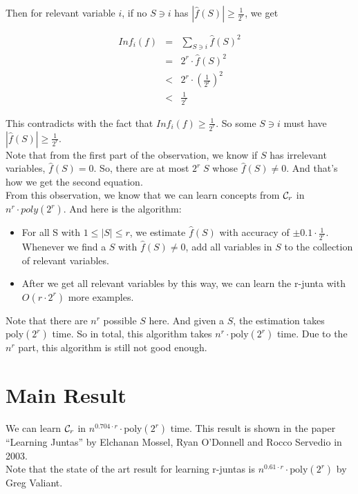 \documentclass[12pt]{article}
\newcommand{\calc}{{\cal C}}
\newcommand{\poly}{\mathrm{poly}}
\begin{document}
Then for relevant variable $i$, if no $S \ni i$ has $|\hat {f}(S)| \ge
\frac {1}{2^r}$, we get

\begin{eqnarray*}
Inf_i(f)
&=& \sum_{S \ni i} \hat {f}(S)^2 \\
&=& 2^r \cdot \hat {f}(S)^2 \\
&<& 2^r \cdot (\frac{1}{2^r})^2 \\
&<& \frac {1}{2^r}
\end{eqnarray*}

This contradicts with the fact that $Inf_i(f) \ge \frac{1}{2^r}$. So
some $S \ni i$ must have $|\hat {f}(S)| \ge \frac {1}{2^r}$. \\

Note that from the first part of the observation, we know if $S$ has
irrelevant variables, $\hat {f}(S) = 0$. So, there are at most 
$2^r \; S$ whose $\hat {f}(S) \neq 0$. And that's how we get the
second equation. \\

From this observation, we know that we can learn concepts from
$\calc_r$ in $n^r \cdot poly(2^r)$. And here is the algorithm:

\begin{itemize}
\item For all S with $1 \le |S| \le r$, we estimate $\hat {f}(S)$
  with accuracy of $\pm 0.1 \cdot \frac {1}{2^r}$. Whenever we find
  a $S$ with $\hat {f}(S) \neq 0$, add all variables in $S$ to the
  collection of relevant variables.
\item After we get all relevant variables by this way, we can learn
  the r-junta with $O(r \cdot 2^r)$ more examples.
\end{itemize}

Note that there are $n^r$ possible $S$ here. And given a $S$, the
estimation takes $\poly (2^r)$ time. So in total, this algorithm takes
$n^r \cdot \poly (2^r)$ time. Due to the $n^r$ part, this algorithm is
still not good enough.

\section{Main Result}

We can learn $\calc_r$ in $n^{0.704 \cdot r} \cdot \poly(2^r)$
time. This result is shown in the paper ``Learning Juntas'' by
Elchanan Mossel, Ryan O'Donnell and Rocco Servedio in 2003. \\

Note that the state of the art result for learning r-juntas is
$n^{0.61 \cdot r} \cdot \poly(2^r)$ by Greg Valiant. 
\end{document}
